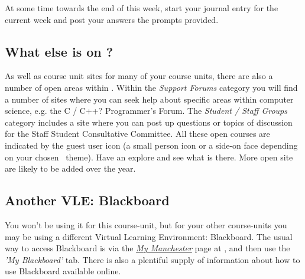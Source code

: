 At some time towards the end of this week, start your journal entry for the current week and post your answers the prompts provided.

\subsection{What else is on \moodle?}
\label{sec:what-else-moodle}


As well as course unit sites for many of your course units, there are also a number of open areas within \moodle. Within the \emph{Support Forums} category you will find a number of sites where you can seek help about specific areas within computer science, e.g. the C / C++? Programmer's Forum. The \emph{Student / Staff Groups} category includes a site where you can post up questions or topics of discussion for the Staff Student Consultative Committee. All these open courses are indicated by the guest user icon (a small person icon or a side-on face depending on your chosen \moodle\ theme). Have an explore and see what is there. More open site are likely to be added over the year.









\subsection{Another VLE: Blackboard}
\label{sec:blackboard}

You won't be using it for this course-unit, but for your other course-units you may be using a different Virtual Learning Environment: \textsf{Blackboard}. The usual way to access \textsf{Blackboard} is via the \href{https://my.manchester.ac.uk}{\emph{My Manchester}} page at , and then use the \emph{'My Blackboard'} tab. There is also a plentiful supply of information about how to use Blackboard available online. 

